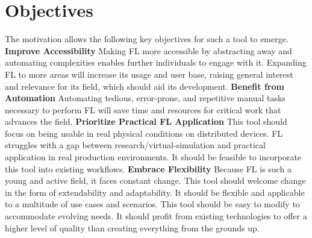 \section{Objectives}\label{section:objectives}

The motivation allows the following key objectives for such a tool to emerge.
\vspace{5mm}
\newline
\textbf{Improve Accessibility}\newline
Making FL more accessible by abstracting away and automating complexities enables further individuals to engage with it.
Expanding FL to more areas will increase its usage and user base, raising general interest and relevance for its field, which should aid its development.
\vspace{5mm}
\newline
\textbf{Benefit from Automation}\newline
Automating tedious, error-prone, and repetitive manual tasks necessary to perform FL will save time and resources for critical work that advances the field.
\vspace{5mm}
\newline
\textbf{Prioritize Practical FL Application}\newline
This tool should focus on being usable in real physical conditions on distributed devices.
FL struggles with a gap between research/virtual-simulation and practical application in real production environments.
It should be feasible to incorporate this tool into existing workflows.
\vspace{5mm}
\newline
\textbf{Embrace Flexibility}\newline
Because FL is such a young and active field, it faces constant change.
This tool should welcome change in the form of extendability and adaptability.
It should be flexible and applicable to a multitude of use cases and scenarios.
This tool should be easy to modify to accommodate evolving needs.
It should profit from existing technologies to offer a higher level of quality than creating everything from the grounds up.
